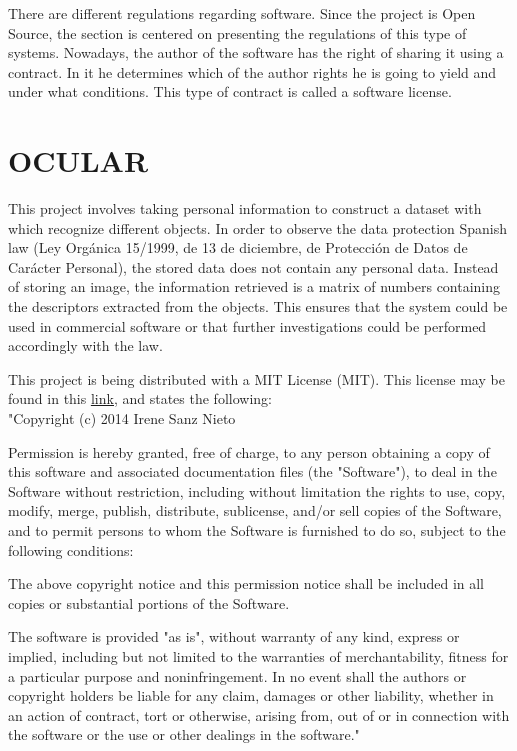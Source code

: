 	There are different regulations regarding software. 
	Since the project is Open Source, the section is centered on presenting the regulations of this type of systems. 
	Nowadays, the author of the software has the right of sharing it using a contract. 
	In it he determines which of the author rights he is going to yield and under what conditions. 
	This type of contract is called a software license. 


	\section{OCULAR}

	This project involves taking personal information to construct a dataset with which recognize different objects. 
	In order to observe the data protection Spanish law (Ley Orgánica 15/1999, de 13 de diciembre, de Protección de Datos de Carácter Personal), the stored data does not contain any personal data. 
	Instead of storing an image, the information retrieved is a matrix of numbers containing the descriptors extracted from the objects. 
	This ensures that the system could be used in commercial software or that further investigations could be performed accordingly with the law. 

	This project is being distributed with a MIT License (MIT). 
	This license may be found in this  \href{https://raw.githubusercontent.com/irenesanznieto/ocular/master/LICENSE.md}{\color{blue}\underline {link}}, and states the following: \\

	"Copyright (c) 2014 Irene Sanz Nieto

Permission is hereby granted, free of charge, to any person obtaining a copy of this software and associated documentation files (the "Software"), to deal in the Software without restriction, including without limitation the rights to use, copy, modify, merge, publish, distribute, sublicense, and/or sell copies of the Software, and to permit persons to whom the Software is furnished to do so, subject to the following conditions:

The above copyright notice and this permission notice shall be included in all copies or substantial portions of the Software.

The software is provided "as is", without warranty of any kind, express or implied, including but not limited to the warranties of merchantability, fitness for a particular purpose and noninfringement. In no event shall the authors or copyright holders be liable for any claim, damages or other liability, whether in an action of contract, tort or otherwise, arising from, out of or in connection with the software or the use or other dealings in the software."
\\

